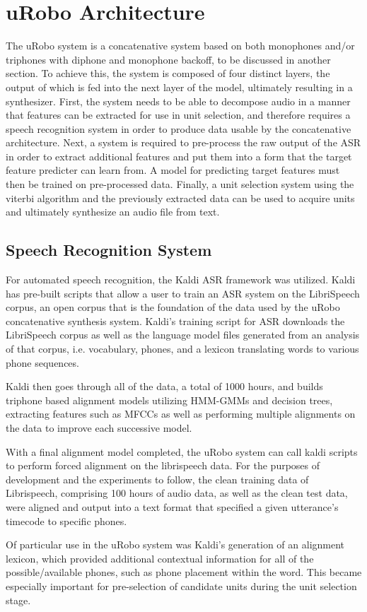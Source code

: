 \documentclass[10pt, journal, compsoc]{IEEEtran}
\begin{document}
\section{uRobo Architecture}
The uRobo system is a concatenative system based on both monophones and/or triphones with diphone and monophone backoff, to be discussed in another section. To achieve this, the system is composed of four distinct layers, the output of which is fed into the next layer of the model, ultimately resulting in a synthesizer. First, the system needs to be able to decompose audio in a manner that features can be extracted for use in unit selection, and therefore requires a speech recognition system in order to produce data usable by the concatenative architecture. Next, a system is required to pre-process the raw output of the ASR in order to extract additional features and put them into a form that the target feature predicter can learn from. A model for predicting target features must then be trained on pre-processed data. Finally, a unit selection system using the viterbi algorithm and the previously extracted data can be used to acquire units and ultimately synthesize an audio file from text.
\subsection{Speech Recognition System}
For automated speech recognition, the Kaldi ASR framework was utilized. Kaldi has pre-built scripts that allow a user to train an ASR system on the LibriSpeech corpus\cite{unknown}, an open corpus that is the foundation of the data used by the uRobo concatenative synthesis system. Kaldi's training script for ASR downloads the LibriSpeech corpus as well as the language model files generated from an analysis of that corpus, i.e. vocabulary, phones, and a lexicon translating words to various phone sequences.\par
Kaldi then goes through all of the data, a total of 1000 hours, and builds triphone based alignment models utilizing HMM-GMMs and decision trees, extracting features such as MFCCs as well as performing multiple alignments on the data to improve each successive model.\par
With a final alignment model completed, the uRobo system can call kaldi scripts to perform forced alignment on the librispeech data. For the purposes of development and the experiments to follow, the clean training data of Librispeech, comprising 100 hours of audio data, as well as the clean test data, were aligned and output into a text format that specified a given utterance's timecode to specific phones. \par
Of particular use in the uRobo system was Kaldi's generation of an alignment lexicon, which provided additional contextual information for all of the possible/available phones, such as phone placement within the word. This became especially important for pre-selection of candidate units during the unit selection stage.
\end{document}
